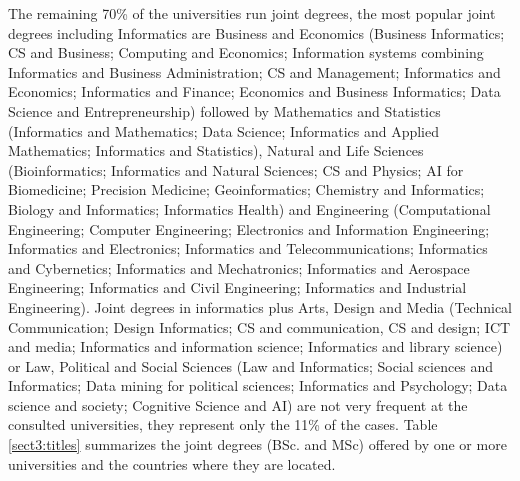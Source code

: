 The remaining 70\% of the universities run joint degrees, the most popular joint degrees including Informatics are  Business and Economics (Business Informatics; CS and Business; Computing and Economics; Information systems combining Informatics and Business Administration; CS and Management; Informatics and Economics; Informatics and Finance; Economics and Business Informatics; Data Science and Entrepreneurship) followed by Mathematics and Statistics (Informatics and Mathematics; Data Science; Informatics and Applied Mathematics; Informatics and Statistics), Natural and Life Sciences (Bioinformatics; Informatics and Natural Sciences; CS and Physics; AI for Biomedicine; Precision Medicine; Geoinformatics; Chemistry and Informatics; Biology and Informatics; Informatics Health) and Engineering (Computational Engineering; Computer Engineering; Electronics and Information Engineering; Informatics and Electronics; Informatics and Telecommunications; Informatics and Cybernetics; Informatics and Mechatronics; Informatics and Aerospace Engineering; Informatics and Civil Engineering; Informatics and Industrial Engineering). Joint degrees in informatics plus Arts, Design and Media (Technical Communication; Design Informatics; CS and communication, CS and design; ICT and media; Informatics and information science; Informatics and library science) or Law, Political and Social Sciences (Law and Informatics; Social sciences and Informatics; Data mining for political sciences; Informatics and Psychology; Data science and society; Cognitive Science and AI) are not very frequent at the consulted universities, they represent only the 11\% of the cases. Table \ref{sect3:titles} summarizes  the joint degrees (BSc. and MSc) offered by one or more universities and the countries where they are located.

